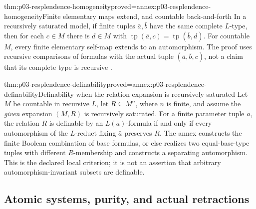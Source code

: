 \begin{hbtheorem}{thm:p03-resplendence-homogeneity}{proved=annex:p03-resplendence-homogeneity}{Finite elementary maps extend, and countable back-and-forth}
In a recursively saturated model, if finite tuples \(\bar a,\bar b\)
have the same complete \(L\)-type, then for each \(c\in M\) there is
\(d\in M\) with
\(\operatorname{tp}(\bar a,c)=\operatorname{tp}(\bar b,d)\).
For countable \(M\), every finite elementary self-map extends to an
automorphism. The proof uses recursive comparisons of formulas with
the actual tuple \((\bar a,\bar b,c)\), not a claim that its complete
type is recursive \cite[Proposition~1.6, pp.~10--11]{Engstrom2004Expansions}.
\end{hbtheorem}

\begin{hbtheorem}{thm:p03-resplendence-definability}{proved=annex:p03-resplendence-definability}{Definability when the relation expansion is recursively saturated}
Let \(M\) be countable in recursive \(L\), let \(R\subseteq M^n\),
where \(n\) is finite, and assume the \emph{given} expansion \((M,R)\)
is recursively saturated. For a finite parameter tuple \(\bar a\),
the relation \(R\) is definable by an \(L(\bar a)\)-formula if and
only if every automorphism of the \(L\)-reduct fixing \(\bar a\)
preserves \(R\). The annex constructs the finite Boolean combination
of base formulas, or else realizes two equal-base-type tuples with
different \(R\)-membership and constructs a separating automorphism.
This is the declared local criterion; it is not an assertion that
arbitrary automorphism-invariant subsets are definable.
\end{hbtheorem}

\subsection{Atomic systems, purity, and actual retractions}

